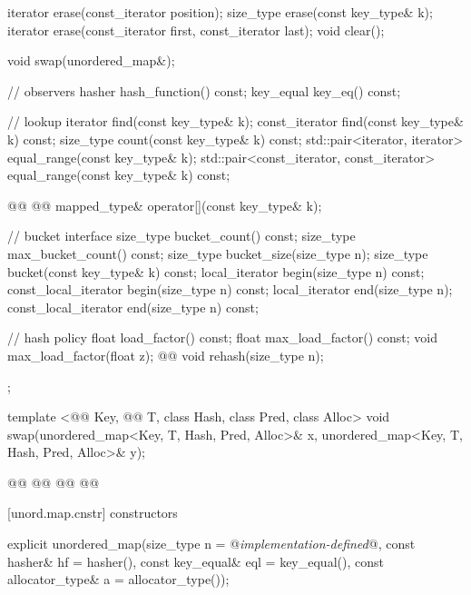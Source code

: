 \documentclass[american,twoside]{book}
\begin{document}
\begin{codeblock}
{{    iterator erase(const_iterator position);
    size_type erase(const key_type& k);
    iterator erase(const_iterator first, const_iterator last);
    void clear();

    void swap(unordered_map&);

    // observers
    hasher hash_function() const;
    key_equal key_eq() const;

    // lookup
    iterator       find(const key_type& k);
    const_iterator find(const key_type& k) const;
    size_type count(const key_type& k) const;
    std::pair<iterator, iterator>             equal_range(const key_type& k);
    std::pair<const_iterator, const_iterator> equal_range(const key_type& k) const;

    @@
          @@
      mapped_type& operator[](const key_type& k);

    // bucket interface
    size_type bucket_count() const;
    size_type max_bucket_count() const;
    size_type bucket_size(size_type n);
    size_type bucket(const key_type& k) const;
    local_iterator begin(size_type n) const;
    const_local_iterator begin(size_type n) const;
    local_iterator end(size_type n);
    const_local_iterator end(size_type n) const;  

    // hash policy
    float load_factor() const;
    float max_load_factor() const;
    void max_load_factor(float z);
    @@ void rehash(size_type n);
  };

  template <@@ Key, @@ T, class Hash, class Pred, class Alloc>
    void swap(unordered_map<Key, T, Hash, Pred, Alloc>& x,
              unordered_map<Key, T, Hash, Pred, Alloc>& y);

  @@
    @@
      @@
        @@
}
\end{codeblock}

[unord.map.cnstr]{ constructors}

%
\begin{itemdecl}
explicit unordered_map(size_type n = @\textit{implementation-defined}@,
                       const hasher& hf = hasher(),
                       const key_equal& eql = key_equal(),
                       const allocator_type& a = allocator_type());
\end{itemdecl}
\end{document}

